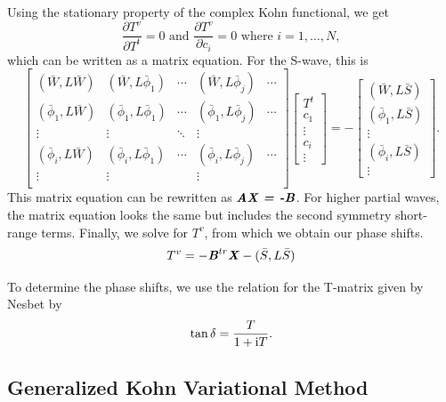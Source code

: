 \documentclass[preprint,showpacs,preprintnumbers,amsmath,amssymb]{revtex4}
\newcommand{\beq}{\begin{equation}}
\newcommand{\eeq}{\end{equation}}
\newcommand{\ii}{{\rm{i}}}
\begin{document}
Using the stationary property of the complex Kohn functional, we get
\beq
\frac{\partial T^v}{\partial T^t} = 0  \text{ and } \frac{\partial T^v}{\partial c_i} = 0 \text{ where $i = 1,\ldots,N$},
\label{eq:ComplexKohnStationary}
\eeq
which can be written as a matrix equation. For the S-wave, this is
\begin{equation}
\label{eq:ComplexKohnMatrix}
\begin{bmatrix} 
 (\bar{W},L\bar{W}) & (\bar{W},L\bar{\phi}_1) & \cdots & (\bar{W},L\bar{\phi}_j) & \cdots\\
 (\bar{\phi}_1,L\bar{W}) & (\bar{\phi}_1,L\bar{\phi}_1) & \cdots & (\bar{\phi}_1,L\bar{\phi}_j) & \cdots\\
 \vdots & \vdots & \ddots & \vdots \\
 (\bar{\phi}_i,L\bar{W}) & (\bar{\phi}_i,L\bar{\phi}_1) & \cdots & (\bar{\phi}_i,L\bar{\phi}_j) & \cdots\\
 \vdots & \vdots & & \vdots & \\
\end{bmatrix}
\begin{bmatrix}
T^t\\
c_1\\
\vdots\\
c_i\\
\vdots
\end{bmatrix}
= -
\begin{bmatrix}
(\bar{W},L\bar{S}) \\
(\bar{\phi}_1,L\bar{S}) \\
\vdots \\
(\bar{\phi}_i,L\bar{S}) \\
\vdots
\end{bmatrix}.
\end{equation}
This matrix equation can be rewritten as $\textbf{\emph{AX = -B}}$. For higher partial waves, the matrix equation looks the same but includes the second symmetry short-range terms. Finally, we solve for $T^v$, from which we obtain our phase shifts.
\begin{equation}
T^v = -\textbf{\emph{B}}^{tr} \textbf{\emph{X}} - (\bar{S},L \bar{S})
\end{equation}

To determine the phase shifts, we use the relation for the T-matrix given by Nesbet \cite{Nesbet2003} by
\begin{equation}
\tan \delta = \frac{T}{1 + \ii T}.
\end{equation}


\subsection{Generalized Kohn Variational Method}
\label{sec:GenKohn}
\end{document}
